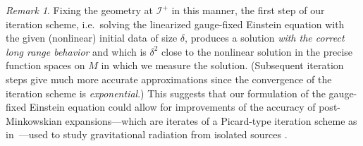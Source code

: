 \documentclass[reqno,11pt,letterpaper]{amsart}
\numberwithin{equation}{section}
\numberwithin{figure}{section}
\theoremstyle{definition}
\theoremstyle{remark}
\newtheorem{rmk}[thm]{Remark}
\newcommand{\ms}{\mathscr}
\newcommand{\scri}{\ms I}
\begin{document}
\begin{rmk}
\label{RmkICD}
  Fixing the geometry at $\scri^+$ in this manner, the first step of our iteration scheme, i.e.\ solving the linearized gauge-fixed Einstein equation with the given (nonlinear) initial data of size $\delta$, produces a solution \emph{with the correct long range behavior} and which is $\delta^2$ close to the nonlinear solution in the precise function spaces on $M$ in which we measure the solution. (Subsequent iteration steps give much more accurate approximations since the convergence of the iteration scheme is \emph{exponential}.) This suggests that our formulation of the gauge-fixed Einstein equation could allow for improvements of the accuracy of post-Minkowskian expansions---which are iterates of a Picard-type iteration scheme as in~\cite[Equation~(1.7)]{LindbladRodnianskiGlobalStability}---used to study gravitational radiation from isolated sources \cite{BlanchetRadiation}.
\end{rmk}
\end{document}
